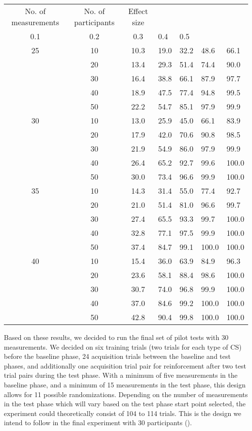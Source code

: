 \documentclass{jote-article}
\begin{document}
  \begin{table}

  \label{Table 1}\caption{}
  \begin{tabular}{c  c  c}

  No. of measurements & No. of participants & Effect size & \\
0.1 & 0.2 & 0.3 & 0.4 & 0.5 &  &  & \\
25 & 10 & 10.3 & 19.0 & 32.2 & 48.6 & 66.1 & \\
 & 20 & 13.4 & 29.3 & 51.4 & 74.4 & 90.0 & \\
 & 30 & 16.4 & 38.8 & 66.1 & 87.9 & 97.7 & \\
 & 40 & 18.9 & 47.5 & 77.4 & 94.8 & 99.5 & \\
 & 50 & 22.2 & 54.7 & 85.1 & 97.9 & 99.9 & \\
30 & 10 & 13.0 & 25.9 & 45.0 & 66.1 & 83.9 & \\
 & 20 & 17.9 & 42.0 & 70.6 & 90.8 & 98.5 & \\
 & 30 & 21.9 & 54.9 & 86.0 & 97.9 & 99.9 & \\
 & 40 & 26.4 & 65.2 & 92.7 & 99.6 & 100.0 & \\
 & 50 & 30.0 & 73.4 & 96.6 & 99.9 & 100.0 & \\
35 & 10 & 14.3 & 31.4 & 55.0 & 77.4 & 92.7 & \\
 & 20 & 21.0 & 51.4 & 81.0 & 96.6 & 99.7 & \\
 & 30 & 27.4 & 65.5 & 93.3 & 99.7 & 100.0 & \\
 & 40 & 32.8 & 77.1 & 97.5 & 99.9 & 100.0 & \\
 & 50 & 37.4 & 84.7 & 99.1 & 100.0 & 100.0 & \\
40 & 10 & 15.4 & 36.0 & 63.9 & 84.9 & 96.3 & \\
 & 20 & 23.6 & 58.1 & 88.4 & 98.6 & 100.0 & \\
 & 30 & 30.7 & 74.0 & 96.8 & 99.9 & 100.0 & \\
 & 40 & 37.0 & 84.6 & 99.2 & 100.0 & 100.0 & \\
 & 50 & 42.8 & 90.4 & 99.8 & 100.0 & 100.0 & \\


\end{tabular}


\end{table}
Based on these results, we decided to run the final set of pilot tests with 30 measurements. We decided on six training trials (two trials for each type of CS) before the baseline phase, 24 acquisition trials between the baseline and test phases, and additionally one acquisition trial pair for reinforcement after two test trial pairs during the test phase. With a minimum of five measurements in the baseline phase, and a minimum of 15 measurements in the test phase, this design allows for 11 possible randomizations. Depending on the number of measurements in the test phase which will vary based on the test phase start point selected, the experiment could theoretically consist of 104 to 114 trials. This is the design we intend to follow in the final experiment with 30 participants ().
\end{document}

